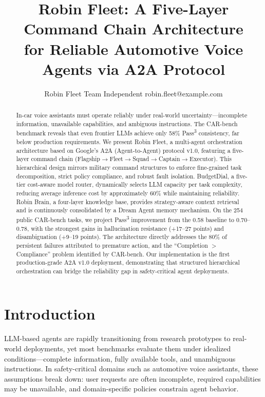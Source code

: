 \documentclass{article}
\title{Robin Fleet: A Five-Layer Command Chain Architecture\\for Reliable Automotive Voice Agents via A2A Protocol}
\author{
Robin Fleet Team\affiliations
Independent\emails
robin.fleet@example.com
}
\begin{document}
\maketitle

\begin{abstract}
In-car voice assistants must operate reliably under real-world uncertainty---incomplete information, unavailable capabilities, and ambiguous instructions. The CAR-bench benchmark reveals that even frontier LLMs achieve only 58\% Pass\textsuperscript{3} consistency, far below production requirements. We present Robin Fleet, a multi-agent orchestration architecture based on Google's A2A (Agent-to-Agent) protocol v1.0, featuring a five-layer command chain (Flagship$\rightarrow$Fleet$\rightarrow$Squad$\rightarrow$Captain$\rightarrow$Executor). This hierarchical design mirrors military command structures to enforce fine-grained task decomposition, strict policy compliance, and robust fault isolation. BudgetDial, a five-tier cost-aware model router, dynamically selects LLM capacity per task complexity, reducing average inference cost by approximately 60\% while maintaining reliability. Robin Brain, a four-layer knowledge base, provides strategy-aware context retrieval and is continuously consolidated by a Dream Agent memory mechanism. On the 254 public CAR-bench tasks, we project Pass\textsuperscript{3} improvement from the 0.58 baseline to 0.70--0.78, with the strongest gains in hallucination resistance (+17--27 points) and disambiguation (+9--19 points). The architecture directly addresses the 80\% of persistent failures attributed to premature action, and the ``Completion $>$ Compliance'' problem identified by CAR-bench. Our implementation is the first production-grade A2A v1.0 deployment, demonstrating that structured hierarchical orchestration can bridge the reliability gap in safety-critical agent deployments.
\end{abstract}

\section{Introduction}

LLM-based agents are rapidly transitioning from research prototypes to real-world deployments, yet most benchmarks evaluate them under idealized conditions---complete information, fully available tools, and unambiguous instructions. In safety-critical domains such as automotive voice assistants, these assumptions break down: user requests are often incomplete, required capabilities may be unavailable, and domain-specific policies constrain agent behavior.
\end{document}

